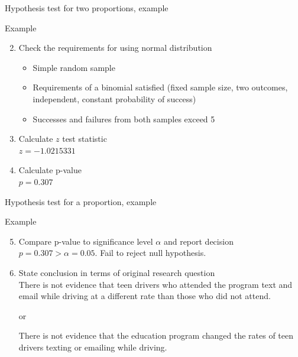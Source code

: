 \documentclass[xcolor=table, handout]{beamer}
\begin{document}
\begin{frame}{Hypothesis test for two proportions, example}
\begin{exampleblock}{Example}
\large
\begin{enumerate}
\setcounter{enumi}{1}
\item Check the requirements for using normal distribution
\pause\begin{itemize}
\item Simple random sample
\item Requirements of a binomial satisfied (fixed sample size, two outcomes, independent, constant probability of success)
\item Successes and failures from both samples exceed 5
\end{itemize}
\pause\item Calculate $z$ test statistic\\
\pause$z = -1.0215331$
\pause\item Calculate p-value\\
\pause$p = 0.307$
\end{enumerate}
\end{exampleblock}
\end{frame}

\begin{frame}{Hypothesis test for a proportion, example}
\begin{exampleblock}{Example}
\large
\begin{enumerate}
\setcounter{enumi}{4}
\item Compare p-value to significance level $\alpha$ and report decision\\
\pause$p = 0.307 > \alpha =0.05$. Fail to reject null hypothesis.

\pause\item State conclusion in terms of original research question\\
\pause There is not evidence that teen drivers who attended the program text and email while driving at a different rate than those who did not attend.\\
{\centering or \par}\smallskip
There is not evidence that the education program changed the rates of teen drivers texting or emailing while driving.
\end{enumerate}

\end{exampleblock}
\end{frame}
\end{document}
